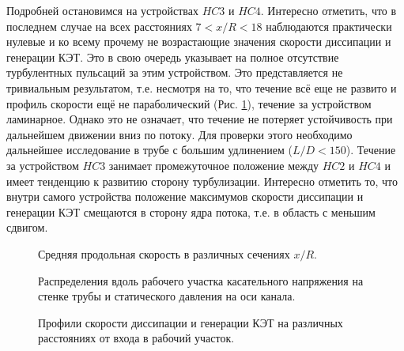 %
Подробней остановимся на устройствах $HC3$ и $HC4$. 
%
Интересно отметить, что в последнем случае на всех расстояниях $7 < x/R < 18$ наблюдаются практически нулевые и ко всему прочему не возрастающие значения скорости диссипации и генерации КЭТ. 
%
Это в свою очередь указывает на полное отсутствие турбулентных пульсаций за этим устройством. 
%
Это представляется не тривиальным результатом, т.е. несмотря на то, что течение всё еще не развито и профиль скорости ещё не параболический (Рис. \ref{ch3:fig:vels}), течение за устройством ламинарное. 
%
Однако это не означает, что течение не потеряет устойчивость при дальнейшем движении вниз по потоку. 
%
Для проверки этого необходимо дальнейшее исследование в трубе с большим удлинением ($L/D < 150$). 
%
Течение за устройством $HC3$ занимает промежуточное положение между $HC2$ и $HC4$ и имеет тенденцию к развитию сторону турбулизации. 
%
Интересно отметить то, что внутри самого устройства положение максимумов скорости диссипации и генерации КЭТ смещаются в сторону ядра потока, т.е. в область с меньшим сдвигом.
%


\begin{figure}[ht]
    \caption{Средняя продольная скорость в различных сечениях $x/R$.}\label{ch3:fig:vels}
\end{figure}

\begin{figure}[ht]
    \caption{Распределения вдоль рабочего участка касательного напряжения на стенке трубы и статического давления на оси канала.}\label{ch3:fig:tau}
\end{figure}

\begin{figure}[ht]
    \caption{Профили скорости диссипации и генерации КЭТ на различных расстояниях от входа в рабочий участок.}\label{ch3:fig:tke}
\end{figure}


